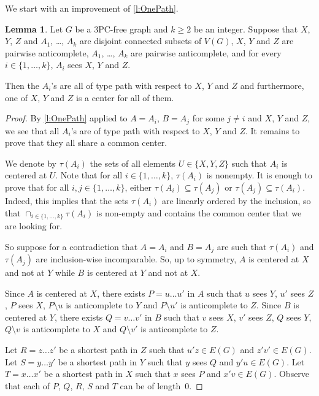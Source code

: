 \documentclass[11pt]{article}
\newcommand{\sm}{\setminus}
\theoremstyle{definition}
\newtheorem{lemma}[theorem]{Lemma}
\theoremstyle{definition}
\begin{document}
We start with an improvement of \cref{l:OnePath}.

\begin{lemma}
  \label{l:allPath}
  Let $G$ be a 3PC-free graph and $k\geq 2$ be an
  integer. Suppose that $X$, $Y$, $Z$ and $A_1$, \dots, $A_k$ are
  disjoint connected subsets of $V(G)$, $X$, $Y$ and $Z$ are pairwise
  anticomplete, $A_1$, \dots, $A_k$ are pairwise
  anticomplete, and for every $i\in \{1, \dots, k\}$, $A_i$ sees
  $X$, $Y$ and $Z$.

  Then the $A_i$'s are all of type path with respect to $X$, $Y$ and $Z$
  and furthermore, one of $X$, $Y$ and $Z$ is a center for all of
  them.
\end{lemma}

\begin{proof}
  By \cref{l:OnePath} applied to $A=A_i$, $B=A_{j}$ for some $j\neq i$
  and $X$, $Y$ and $Z$, we see that all $A_i$'s are of type path with
  respect to $X$, $Y$ and $Z$. It remains to prove that they all share
  a common center.

  We denote by $\tau(A_i)$ the sets of all elements
  $U \in \{X, Y, Z\}$ such that $A_i$ is centered at $U$.  Note that
  for all $i\in \{1, \dots, k\}$, $\tau(A_i)$ is nonempty. It is
  enough to prove that for all $i, j \in \{1, \dots, k\}$, either
  $\tau(A_i) \subseteq \tau(A_j)$ or $\tau(A_j) \subseteq \tau(A_i)$.
  Indeed, this implies that the sets $\tau(A_i)$ are linearly ordered
  by the inclusion, so that $\cap_{i\in \{1, \dots, k\}} \tau (A_i)$
  is non-empty and contains the common center that we are looking for.
 
  So suppose for a contradiction that $A= A_i$ and $B=A_j$ are such
  that $\tau(A_i)$ and $\tau(A_j)$ are inclusion-wise
  incomparable. So, up to symmetry, $A$ is centered at $X$ and not at
  $Y$ while $B$ is centered at $Y$ and not at $X$.

  Since $A$ is centered at $X$, there exists $P= u\dots u'$ in $A$
  such that $u$ sees $Y$, $u'$ sees $Z$, $P$ sees $X$, $P\sm u$ is
  anticomplete to $Y$ and $P\sm u'$ is anticomplete to $Z$.  Since $B$
  is centered at $Y$, there exists $Q= v\dots v'$ in $B$ such that $v$
  sees $X$, $v'$ sees $Z$, $Q$ sees $Y$, $Q\sm v$ is anticomplete to
  $X$ and $Q\sm v'$ is anticomplete to $Z$.

  Let $R = z\dots z'$ be a shortest path in $Z$ such that
  $u'z \in E(G)$ and $z'v'\in E(G)$. Let $S = y\dots y'$ be a shortest
  path in $Y$ such that $y$ sees $Q$ and $y'u\in E(G)$.  Let
  $T= x\dots x'$ be a shortest path in $X$ such that $x$ sees $P$ and
  $x'v\in E(G)$.  Observe that each of $P$, $Q$, $R$, $S$ and $T$ can
  be of length~0.


\end{proof}
\end{document}
